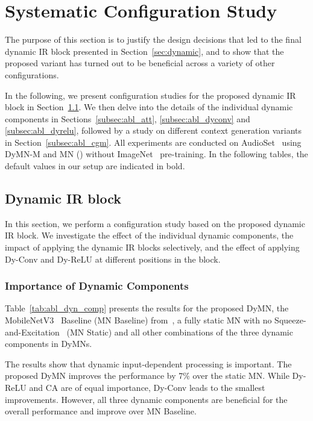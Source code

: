 \documentclass[lettersize,journal]{IEEEtran}
\begin{document}
\section{Systematic Configuration Study}
\label{sec:ablation}

The purpose of this section is to justify the design decisions that led to the final dynamic IR block presented in Section~\ref{sec:dynamic}, and to show that the proposed variant has turned out to be beneficial across a variety of other configurations.

In the following, we present configuration studies for the proposed dynamic IR block in Section~\ref{subsec:abl_block}. We then delve into the details of the individual dynamic components in Sections~\ref{subsec:abl_att}, \ref{subsec:abl_dyconv} and \ref{subsec:abl_dyrelu}, followed by a study on different context generation variants in Section~\ref{subsec:abl_cgm}. All experiments are conducted on AudioSet~\cite{audioset2017Gemmeke} using DyMN-M and MN () without ImageNet~\cite{Deng09ImageNet} pre-training. In the following tables, the default values in our setup are indicated in bold.

\subsection{Dynamic IR block}
\label{subsec:abl_block}

In this section, we perform a configuration study based on the proposed dynamic IR block. We investigate the effect of the individual dynamic components, the impact of applying the dynamic IR blocks selectively, and the effect of applying Dy-Conv and Dy-ReLU at different positions in the block.

\subsubsection{Importance of Dynamic Components}

Table~\ref{tab:abl_dyn_comp} presents the results for the proposed DyMN, the MobileNetV3~\cite{Howard19MobileNetV3} Baseline (MN Baseline) from~\cite{Schmid22Efficient}, a fully static MN with no Squeeze-and-Excitation~\cite{Hu18Squeeze} (MN Static) and all other combinations of the three dynamic components in DyMNs.

The results show that dynamic input-dependent processing is important. The proposed DyMN improves the performance by 7\% over the static MN. While Dy-ReLU and CA are of equal importance, Dy-Conv leads to the smallest improvements. However, all three dynamic components are beneficial for the overall performance and improve over MN Baseline. 
\end{document}
